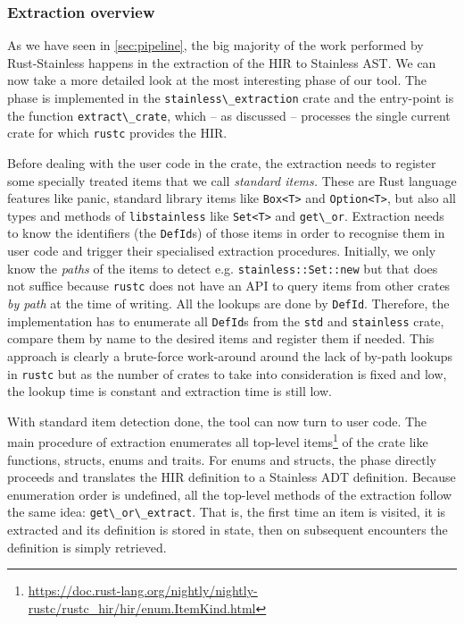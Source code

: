 \subsubsection{Extraction overview}
\label{sec:extraction-overview}

As we have seen in \autoref{sec:pipeline}, the big majority of the work
performed by Rust-Stainless happens in the extraction of the HIR to
Stainless AST. We can now take a more detailed look at the most
interesting phase of our tool. The phase is implemented in the
\passthrough{\lstinline!stainless\_extraction!} crate and the
entry-point is the function \passthrough{\lstinline!extract\_crate!},
which -- as discussed -- processes the single current crate for which
\passthrough{\lstinline!rustc!} provides the HIR.

Before dealing with the user code in the crate, the extraction needs to
register some specially treated items that we call \emph{standard
items.} These are Rust language features like panic, standard library
items like \passthrough{\lstinline!Box<T>!} and
\passthrough{\lstinline!Option<T>!}, but also all types and methods of
\passthrough{\lstinline!libstainless!} like
\passthrough{\lstinline!Set<T>!} and \passthrough{\lstinline!get\_or!}.
Extraction needs to know the identifiers (the
\passthrough{\lstinline!DefId!}s) of those items in order to recognise
them in user code and trigger their specialised extraction procedures.
Initially, we only know the \emph{paths} of the items to detect e.g.
\passthrough{\lstinline!stainless::Set::new!} but that does not suffice
because \passthrough{\lstinline!rustc!} does not have an API to query
items from other crates \emph{by path} at the time of writing. All the
lookups are done by \passthrough{\lstinline!DefId!}. Therefore, the
implementation has to enumerate all \passthrough{\lstinline!DefId!}s
from the \passthrough{\lstinline!std!} and
\passthrough{\lstinline!stainless!} crate, compare them by name to the
desired items and register them if needed. This approach is clearly a
brute-force work-around around the lack of by-path lookups in
\passthrough{\lstinline!rustc!} but as the number of crates to take into
consideration is fixed and low, the lookup time is constant and
extraction time is still low.

With standard item detection done, the tool can now turn to user code.
The main procedure of extraction enumerates all top-level
items\footnote{\url{https://doc.rust-lang.org/nightly/nightly-rustc/rustc_hir/hir/enum.ItemKind.html}}
of the crate like functions, structs, enums and traits. For enums and
structs, the phase directly proceeds and translates the HIR definition
to a Stainless ADT definition. Because enumeration order is undefined,
all the top-level methods of the extraction follow the same idea:
\passthrough{\lstinline!get\_or\_extract!}. That is, the first time an
item is visited, it is extracted and its definition is stored in state,
then on subsequent encounters the definition is simply retrieved.

